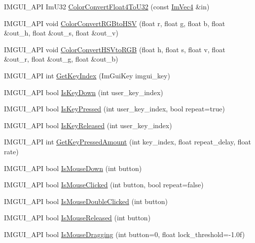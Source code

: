\begin{DoxyCompactItemize}
\item 
I\+M\+G\+U\+I\+\_\+\+A\+PI Im\+U32 \hyperlink{namespace_im_gui_abe2691de0b1a71c774ab24cc91564a94}{Color\+Convert\+Float4\+To\+U32} (const \hyperlink{struct_im_vec4}{Im\+Vec4} \&in)
\item 
I\+M\+G\+U\+I\+\_\+\+A\+PI void \hyperlink{namespace_im_gui_aaed5ed34aaaa02b61cbb67598c0ad9ca}{Color\+Convert\+R\+G\+Bto\+H\+SV} (float r, float g, float b, float \&out\+\_\+h, float \&out\+\_\+s, float \&out\+\_\+v)
\item 
I\+M\+G\+U\+I\+\_\+\+A\+PI void \hyperlink{namespace_im_gui_a074427678b3e56378b7dcdefa4c8b5c7}{Color\+Convert\+H\+S\+Vto\+R\+GB} (float h, float s, float v, float \&out\+\_\+r, float \&out\+\_\+g, float \&out\+\_\+b)
\item 
I\+M\+G\+U\+I\+\_\+\+A\+PI int \hyperlink{namespace_im_gui_a6cf235f0d0787d51a93f6d90e0bdff9b}{Get\+Key\+Index} (Im\+Gui\+Key imgui\+\_\+key)
\item 
I\+M\+G\+U\+I\+\_\+\+A\+PI bool \hyperlink{namespace_im_gui_a633d848504c89e7756ddd33474bc78d2}{Is\+Key\+Down} (int user\+\_\+key\+\_\+index)
\item 
I\+M\+G\+U\+I\+\_\+\+A\+PI bool \hyperlink{namespace_im_gui_a83331a8afa5316bc98ed9c98b151ac01}{Is\+Key\+Pressed} (int user\+\_\+key\+\_\+index, bool repeat=true)
\item 
I\+M\+G\+U\+I\+\_\+\+A\+PI bool \hyperlink{namespace_im_gui_a3fb25247181c5c292fe4f932bd20de88}{Is\+Key\+Released} (int user\+\_\+key\+\_\+index)
\item 
I\+M\+G\+U\+I\+\_\+\+A\+PI int \hyperlink{namespace_im_gui_ad94a09fc01052f02fe11bec5a3c11275}{Get\+Key\+Pressed\+Amount} (int key\+\_\+index, float repeat\+\_\+delay, float rate)
\item 
I\+M\+G\+U\+I\+\_\+\+A\+PI bool \hyperlink{namespace_im_gui_a8ddf4d05de8ab8b9aa70906a22a9973e}{Is\+Mouse\+Down} (int button)
\item 
I\+M\+G\+U\+I\+\_\+\+A\+PI bool \hyperlink{namespace_im_gui_a22b689cf4cf519590c2e2ad4f5462f29}{Is\+Mouse\+Clicked} (int button, bool repeat=false)
\item 
I\+M\+G\+U\+I\+\_\+\+A\+PI bool \hyperlink{namespace_im_gui_a0d39701e7a0d7629e1b96b68e935542e}{Is\+Mouse\+Double\+Clicked} (int button)
\item 
I\+M\+G\+U\+I\+\_\+\+A\+PI bool \hyperlink{namespace_im_gui_aef586112e8d1eb26ce28198d9efe9bba}{Is\+Mouse\+Released} (int button)
\item 
I\+M\+G\+U\+I\+\_\+\+A\+PI bool \hyperlink{namespace_im_gui_a7905828a024c6c005fa1887e62235ca4}{Is\+Mouse\+Dragging} (int button=0, float lock\+\_\+threshold=-\/1.\+0f)

\end{DoxyCompactItemize}
